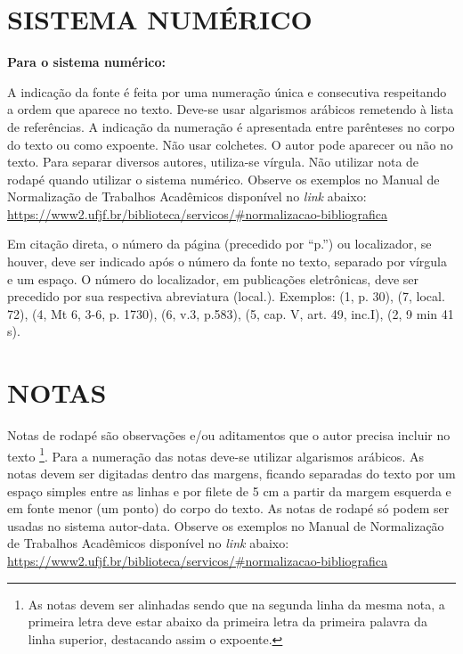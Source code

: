 \documentclass[
        oneside,      %
        english,			
        brazil			 
        ]{abntbibufjf}
\begin{document}
 
\section{SISTEMA NUM\'ERICO} %

\textbf{Para o sistema num\'erico:} 

A indica\c{c}\~{a}o da fonte \'e feita por uma numera\c{c}\~{a}o \'unica e consecutiva respeitando a ordem que aparece no texto. Deve-se usar algarismos ar\'abicos remetendo \`a lista de refer\^encias. A indica\c{c}\~{a}o da numera\c{c}\~{a}o \'e apresentada entre par\^enteses no corpo do texto ou como expoente. N\~ao usar colchetes. O autor pode aparecer ou n\~ao no texto. Para separar diversos autores, utiliza-se v\'irgula. N\~{a}o utilizar nota de rodap\'{e} quando utilizar o sistema num\'{e}rico.
Observe os exemplos no Manual de Normaliza\c{c}\~{a}o de Trabalhos Acad\^emicos dispon\'ivel no \textit{link} abaixo: \\
\url{https://www2.ufjf.br/biblioteca/servicos/#normalizacao-bibliografica}

Em citação direta, o número da página (precedido por ``p.'') ou localizador, se houver, deve ser indicado após o número da fonte no texto, separado por vírgula e um espaço. O número do localizador, em publicações eletrônicas, deve ser precedido por sua respectiva abreviatura (local.). Exemplos: (1, p. 30), (7, local. 72), (4, Mt 6, 3-6, p. 1730), (6, v.3, p.583), (5, cap. V, art. 49, inc.I), (2, 9 min 41 s).

\section{NOTAS} %

Notas de rodap\'e s\~ao observa\c{c}\~{o}es e/ou aditamentos que o autor precisa incluir no texto \footnote[2]{As notas devem ser alinhadas sendo que na segunda linha da mesma nota, a primeira letra deve estar abaixo da primeira letra da primeira palavra da linha superior, destacando assim o expoente.}. Para a numera\c{c}\~{a}o das notas deve-se utilizar algarismos ar\'abicos. As notas devem ser digitadas dentro das margens, ficando separadas do texto por um espa\c{c}o simples entre as linhas e por filete de 5 cm a partir da margem esquerda e em fonte menor (um ponto) do corpo do texto. As notas de rodap\'e s\'o podem ser usadas no sistema autor-data. Observe os exemplos no Manual de Normaliza\c{c}\~{a}o de Trabalhos Acad\^emicos dispon\'ivel no \textit{link} abaixo: \\
\url{https://www2.ufjf.br/biblioteca/servicos/#normalizacao-bibliografica}
\end{document}
